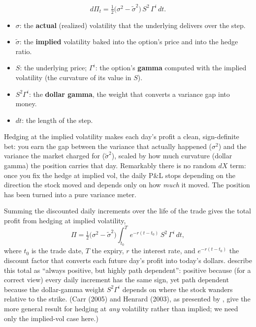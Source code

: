 \begin{equation}
\label{eq:ivrv:aw-daily}
d\Pi_t = \tfrac{1}{2}\big(\sigma^2 - \tilde{\sigma}^2\big)\,S^2\,\Gamma^{i}\,dt .
\end{equation}

\begin{itemize}
  \item $\sigma$: the \textbf{actual} (realized) volatility that the underlying delivers over the step.
  \item $\tilde{\sigma}$: the \textbf{implied} volatility baked into the option's price and into the hedge ratio.
  \item $S$: the underlying price; $\Gamma^{i}$: the option's \textbf{gamma} computed with the implied volatility (the curvature of its value in $S$).
  \item $S^2\Gamma^{i}$: the \textbf{dollar gamma}, the weight that converts a variance gap into money.
  \item $dt$: the length of the step.
\end{itemize}

\begin{intuition}
Hedging at the implied volatility makes each day's profit a clean, sign-definite bet: you earn the gap between the variance that actually happened ($\sigma^2$) and the variance the market charged for ($\tilde{\sigma}^2$), scaled by how much curvature (dollar gamma) the position carries that day. Remarkably there is no random $dX$ term: once you fix the hedge at implied vol, the daily P\&L stops depending on the direction the stock moved and depends only on how \emph{much} it moved. The position has been turned into a pure variance meter.
\end{intuition}

Summing the discounted daily increments over the life of the trade gives the total profit from hedging at implied volatility,
\begin{equation}
\label{eq:ivrv:aw-total}
\Pi = \tfrac{1}{2}\big(\sigma^2 - \tilde{\sigma}^2\big)\int_{t_0}^{T} e^{-r(t-t_0)}\, S^2\,\Gamma^{i}\,dt ,
\end{equation}
where $t_0$ is the trade date, $T$ the expiry, $r$ the interest rate, and $e^{-r(t-t_0)}$ the discount factor that converts each future day's profit into today's dollars. \citet{AhmadWilmott2005} describe this total as ``always positive, but highly path dependent'': positive because (for a correct view) every daily increment has the same sign, yet path dependent because the dollar-gamma weight $S^2\Gamma^{i}$ depends on where the stock wanders relative to the strike. (Carr (2005) and Henrard (2003), as presented by \citealp{AhmadWilmott2005}, give the more general result for hedging at \emph{any} volatility rather than implied; we need only the implied-vol case here.)

